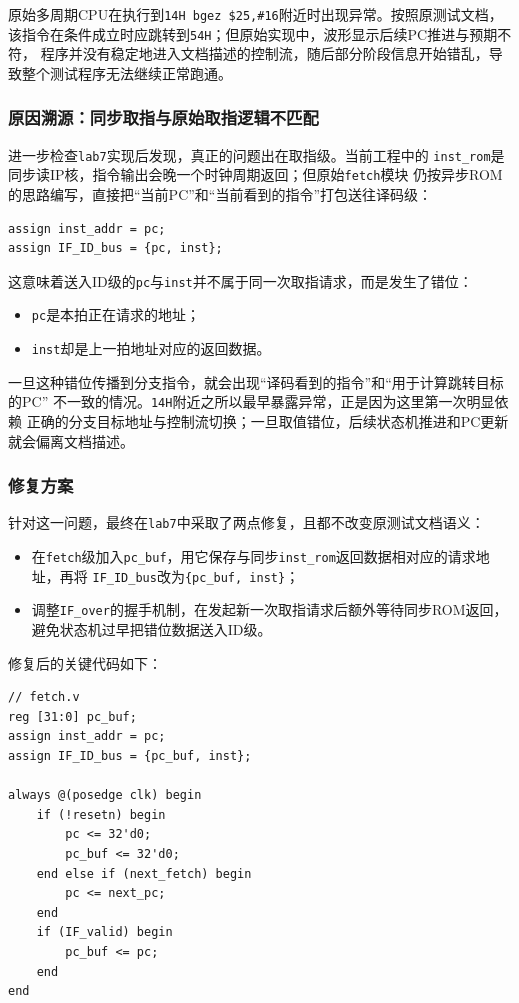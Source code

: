 ﻿\documentclass{article}
\begin{document}
原始多周期CPU在执行到\texttt{14H bgez \$25,\#16}附近时出现异常。按照原测试文档，
该指令在条件成立时应跳转到\texttt{54H}；但原始实现中，波形显示后续PC推进与预期不符，
程序并没有稳定地进入文档描述的控制流，随后部分阶段信息开始错乱，导致整个测试程序无法继续正常跑通。


\subsubsection{原因溯源：同步取指与原始取指逻辑不匹配}

进一步检查\texttt{lab7}实现后发现，真正的问题出在取指级。当前工程中的
\texttt{inst\_rom}是同步读IP核，指令输出会晚一个时钟周期返回；但原始\texttt{fetch}模块
仍按异步ROM的思路编写，直接把“当前PC”和“当前看到的指令”打包送往译码级：
\begin{verbatim}
assign inst_addr = pc;
assign IF_ID_bus = {pc, inst};
\end{verbatim}
这意味着送入ID级的\texttt{pc}与\texttt{inst}并不属于同一次取指请求，而是发生了错位：
\begin{itemize}
  \item \texttt{pc}是本拍正在请求的地址；
  \item \texttt{inst}却是上一拍地址对应的返回数据。
\end{itemize}
一旦这种错位传播到分支指令，就会出现“译码看到的指令”和“用于计算跳转目标的PC”
不一致的情况。\texttt{14H}附近之所以最早暴露异常，正是因为这里第一次明显依赖
正确的分支目标地址与控制流切换；一旦取值错位，后续状态机推进和PC更新就会偏离文档描述。

\subsubsection{修复方案}

针对这一问题，最终在\texttt{lab7}中采取了两点修复，且都不改变原测试文档语义：
\begin{itemize}
  \item 在\texttt{fetch}级加入\texttt{pc\_buf}，用它保存与同步\texttt{inst\_rom}返回数据相对应的请求地址，再将
  \texttt{IF\_ID\_bus}改为\texttt{\{pc\_buf, inst\}}；
  \item 调整\texttt{IF\_over}的握手机制，在发起新一次取指请求后额外等待同步ROM返回，避免状态机过早把错位数据送入ID级。
\end{itemize}
修复后的关键代码如下：
\begin{verbatim}
// fetch.v
reg [31:0] pc_buf;
assign inst_addr = pc;
assign IF_ID_bus = {pc_buf, inst};

always @(posedge clk) begin
    if (!resetn) begin
        pc <= 32'd0;
        pc_buf <= 32'd0;
    end else if (next_fetch) begin
        pc <= next_pc;
    end
    if (IF_valid) begin
        pc_buf <= pc;
    end
end
\end{verbatim}
\end{document}
